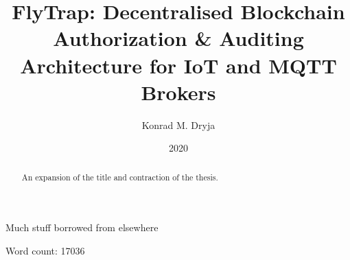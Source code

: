 \documentclass[msci]{abdnthesis}
\title{FlyTrap: Decentralised Blockchain Authorization \& Auditing Architecture for IoT and MQTT Brokers}
\author{Konrad M. Dryja}
\date{2020}
\begin{document}

\maketitle
\makedeclaration


\begin{abstract}
  An expansion of the title and contraction of the thesis.
\end{abstract}

\begin{acknowledgements}
  Much stuff borrowed from elsewhere
\end{acknowledgements}



\tableofcontents\vfill Word count: 17036

\printnoidxglossary[type=\acronymtype,title=Abbreviations,nonumberlist]









\appendix




\end{document}
